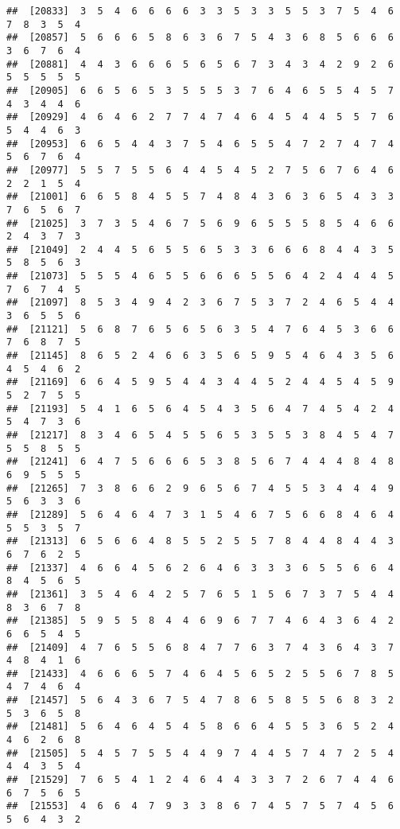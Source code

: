 \documentclass[
]{book}
\begin{document}
\begin{verbatim}
##  [20833]  3  5  4  6  6  6  6  3  3  5  3  3  5  5  3  7  5  4  6  7  8  3  5  4
##  [20857]  5  6  6  6  5  8  6  3  6  7  5  4  3  6  8  5  6  6  6  3  6  7  6  4
##  [20881]  4  4  3  6  6  6  5  6  5  6  7  3  4  3  4  2  9  2  6  5  5  5  5  5
##  [20905]  6  6  5  6  5  3  5  5  5  3  7  6  4  6  5  5  4  5  7  4  3  4  4  6
##  [20929]  4  6  4  6  2  7  7  4  7  4  6  4  5  4  4  5  5  7  6  5  4  4  6  3
##  [20953]  6  6  5  4  4  3  7  5  4  6  5  5  4  7  2  7  4  7  4  5  6  7  6  4
##  [20977]  5  5  7  5  5  6  4  4  5  4  5  2  7  5  6  7  6  4  6  2  2  1  5  4
##  [21001]  6  6  5  8  4  5  5  7  4  8  4  3  6  3  6  5  4  3  3  7  6  5  6  7
##  [21025]  3  7  3  5  4  6  7  5  6  9  6  5  5  5  8  5  4  6  6  2  4  3  7  3
##  [21049]  2  4  4  5  6  5  5  6  5  3  3  6  6  6  8  4  4  3  5  5  8  5  6  3
##  [21073]  5  5  5  4  6  5  5  6  6  6  5  5  6  4  2  4  4  4  5  7  6  7  4  5
##  [21097]  8  5  3  4  9  4  2  3  6  7  5  3  7  2  4  6  5  4  4  3  6  5  5  6
##  [21121]  5  6  8  7  6  5  6  5  6  3  5  4  7  6  4  5  3  6  6  7  6  8  7  5
##  [21145]  8  6  5  2  4  6  6  3  5  6  5  9  5  4  6  4  3  5  6  4  5  4  6  2
##  [21169]  6  6  4  5  9  5  4  4  3  4  4  5  2  4  4  5  4  5  9  5  2  7  5  5
##  [21193]  5  4  1  6  5  6  4  5  4  3  5  6  4  7  4  5  4  2  4  5  4  7  3  6
##  [21217]  8  3  4  6  5  4  5  5  6  5  3  5  5  3  8  4  5  4  7  5  5  8  5  5
##  [21241]  6  4  7  5  6  6  6  5  3  8  5  6  7  4  4  4  8  4  8  6  9  5  5  5
##  [21265]  7  3  8  6  6  2  9  6  5  6  7  4  5  5  3  4  4  4  9  5  6  3  3  6
##  [21289]  5  6  4  6  4  7  3  1  5  4  6  7  5  6  6  8  4  6  4  5  5  3  5  7
##  [21313]  6  5  6  6  4  8  5  5  2  5  5  7  8  4  4  8  4  4  3  6  7  6  2  5
##  [21337]  4  6  6  4  5  6  2  6  4  6  3  3  3  6  5  5  6  6  4  8  4  5  6  5
##  [21361]  3  5  4  6  4  2  5  7  6  5  1  5  6  7  3  7  5  4  4  8  3  6  7  8
##  [21385]  5  9  5  5  8  4  4  6  9  6  7  7  4  6  4  3  6  4  2  6  6  5  4  5
##  [21409]  4  7  6  5  5  6  8  4  7  7  6  3  7  4  3  6  4  3  7  4  8  4  1  6
##  [21433]  4  6  6  6  5  7  4  6  4  5  6  5  2  5  5  6  7  8  5  4  7  4  6  4
##  [21457]  5  6  4  3  6  7  5  4  7  8  6  5  8  5  5  6  8  3  2  5  3  6  5  8
##  [21481]  5  6  4  6  4  5  4  5  8  6  6  4  5  5  3  6  5  2  4  4  6  2  6  8
##  [21505]  5  4  5  7  5  5  4  4  9  7  4  4  5  7  4  7  2  5  4  4  4  3  5  4
##  [21529]  7  6  5  4  1  2  4  6  4  4  3  3  7  2  6  7  4  4  6  6  7  5  6  5
##  [21553]  4  6  6  4  7  9  3  3  8  6  7  4  5  7  5  7  4  5  6  5  6  4  3  2

\end{verbatim}
\end{document}
